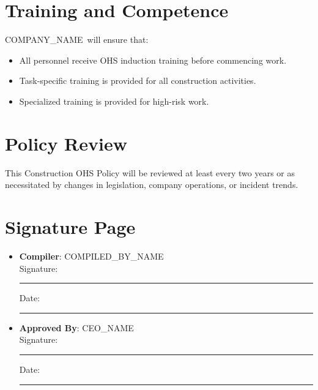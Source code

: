 \documentclass[11pt]{article}
\newcommand{\clientName}{{{COMPANY_NAME}}}
\newcommand{\compilerName}{{{COMPILED_BY_NAME}}}
\begin{document}
\section{Training and Competence}
\clientName\ will ensure that:
\begin{itemize}
    \item All personnel receive OHS induction training before commencing work.
    \item Task-specific training is provided for all construction activities.
    \item Specialized training is provided for high-risk work.
\end{itemize}

\section{Policy Review}
This Construction OHS Policy will be reviewed at least every two years or as necessitated by changes in legislation, company operations, or incident trends.

\section{Signature Page}
\begin{itemize}
  \item \textbf{Compiler}: \compilerName \\
    Signature: \rule{5cm}{0.4pt} \quad Date: \rule{3cm}{0.4pt}
  \item \textbf{Approved By}: {{CEO_NAME}} \\
    Signature: \rule{5cm}{0.4pt} \quad Date: \rule{3cm}{0.4pt}
\end{itemize}
\end{document}
